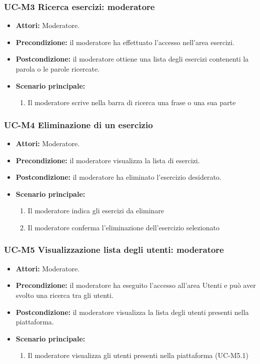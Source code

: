 \subsubsection{UC-M3 Ricerca esercizi: moderatore}
	\begin{itemize}
		\item \textbf{Attori:} Moderatore.
		\item \textbf{Precondizione:} il moderatore ha effettuato l'accesso nell'area esercizi.
		\item \textbf{Postcondizione:} il moderatore ottiene una lista degli esercizi contenenti la parola o le parole ricercate.
		\item \textbf{Scenario principale:}
			\begin{enumerate}
				\item Il moderatore scrive nella barra di ricerca una frase o una sua parte
			\end{enumerate}
	\end{itemize}
	
\subsubsection{UC-M4 Eliminazione di un esercizio}
			\begin{itemize}
			\item \textbf{Attori:} Moderatore.
			\item \textbf{Precondizione:} il moderatore visualizza la lista di esercizi.
			\item \textbf{Postcondizione:} il moderatore ha eliminato l'esercizio desiderato.
			\item \textbf{Scenario principale:}
				\begin{enumerate}
					\item Il moderatore indica gli esercizi da eliminare
					\item Il moderatore conferma l'eliminazione dell'esercizio selezionato
				\end{enumerate}
		\end{itemize}

\subsubsection{UC-M5 Visualizzazione lista degli utenti: moderatore}
	\begin{itemize}
		\item \textbf{Attori:} Moderatore.
		\item \textbf{Precondizione:} il moderatore ha eseguito l'accesso all'area Utenti e può aver svolto una ricerca tra gli utenti.
		\item \textbf{Postcondizione:} il moderatore visualizza la lista degli utenti presenti nella piattaforma.
		\item \textbf{Scenario principale:}
			\begin{enumerate}
				\item Il moderatore visualizza gli utenti presenti nella piattaforma (UC-M5.1)
			\end{enumerate}
	\end{itemize}
	
